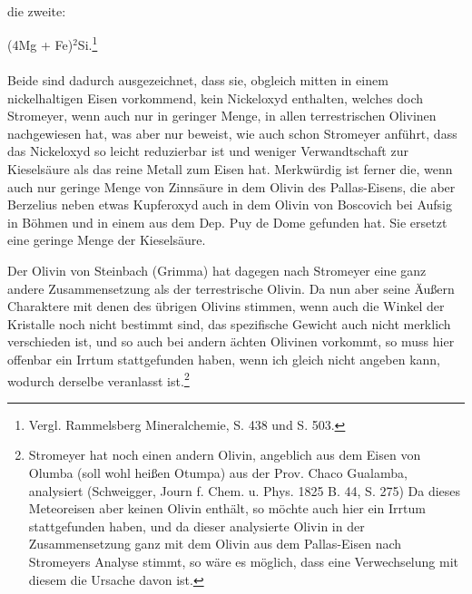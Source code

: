 \documentclass[a4paper, 11pt, oneside]{article}
\begin{document}
\paragraph{}
die zweite:
\begin{center}
(4Mg + Fe)$^{2}$Si.\footnote{Vergl. Rammelsberg Mineralchemie, S. 438 und S. 503.}
\end{center}
\paragraph{}
Beide sind dadurch ausgezeichnet, dass sie, obgleich mitten in einem nickelhaltigen Eisen vorkommend, kein Nickeloxyd enthalten, welches doch Stromeyer, wenn auch nur in geringer Menge, in allen terrestrischen Olivinen nachgewiesen hat, was aber nur beweist, wie auch schon Stromeyer anführt, dass das Nickeloxyd so leicht reduzierbar ist und weniger Verwandtschaft zur Kieselsäure als das reine Metall zum Eisen hat. Merkwürdig ist ferner die, wenn auch nur geringe Menge von Zinnsäure in dem Olivin des Pallas-Eisens, die aber Berzelius neben etwas Kupferoxyd auch in dem Olivin von Boscovich bei Aufsig in Böhmen und in einem aus dem Dep. Puy de Dome gefunden hat. Sie ersetzt eine geringe Menge der Kieselsäure.

Der Olivin von Steinbach (Grimma) hat dagegen nach Stromeyer eine ganz andere Zusammensetzung als der terrestrische Olivin. Da nun aber seine Äußern Charaktere mit denen des übrigen Olivins stimmen, wenn auch die Winkel der Kristalle noch nicht bestimmt sind, das spezifische Gewicht auch nicht merklich verschieden ist, und so auch bei andern ächten Olivinen vorkommt, so muss hier offenbar ein Irrtum stattgefunden haben, wenn ich gleich nicht angeben kann, wodurch derselbe veranlasst ist.\footnote{Stromeyer hat noch einen andern Olivin, angeblich aus dem Eisen von Olumba (soll wohl heißen Otumpa) aus der Prov. Chaco Gualamba, analysiert (Schweigger, Journ f. Chem. u. Phys. 1825 B. 44, S. 275) Da dieses Meteoreisen aber keinen Olivin enthält, so möchte auch hier ein Irrtum stattgefunden haben, und da dieser analysierte Olivin in der Zusammensetzung ganz mit dem Olivin aus dem Pallas-Eisen nach Stromeyers Analyse stimmt, so wäre es möglich, dass eine Verwechselung mit diesem die Ursache davon ist.}
\end{document}
